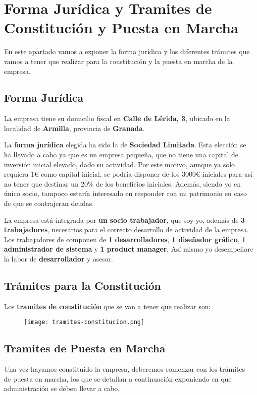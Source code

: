 \section{Forma Jurídica y Tramites de Constitución y Puesta en Marcha}
En este apartado vamos a exponer la forma jurídica y los diferentes trámites que vamos a tener que realizar para la constitución y la puesta en marcha de la empresa.

\subsection{Forma Jurídica}
La empresa tiene su domicilio fiscal en \textbf{Calle de Lérida, 3}, ubicado en la localidad de \textbf{Armilla}, provincia de \textbf{Granada}.

La \textbf{forma jurídica} elegida ha sido la de \textbf{Sociedad Limitada}. Esta elección se ha llevado a cabo ya que es un empresa pequeña, que no tiene una capital de inversión inicial elevado, dado su actividad. Por este motivo, aunque ya solo requiera 1€ como capital inicial, se podría disponer de los 3000€ iniciales para así no tener que destinar un 20\% de los beneficios iniciales. Además, siendo yo en único socio, tampoco estaría interesado en responder con mi patrimonio en caso de que se contrajeran deudas.

La empresa está integrada por \textbf{un socio trabajador}, que soy yo, además de \textbf{3 trabajadores}, necesarios para el correcto desarrollo de actividad de la empresa. Los trabajadores de componen de \textbf{1 desarrolladores}, \textbf{1 diseñador gráfico}, \textbf{1 administrador de sistema} y \textbf{1 product manager}. Así mismo yo desempeñare la labor de \textbf{desarrollador} y {asesor}.

\subsection{Trámites para la Constitución}
Los\textbf{ tramites de constitución} que se van a tener que realizar son:
\begin{figure}[H]
    \centering
    \texttt{[image: tramites-constitucion.png]}
\end{figure}

\subsection{Tramites de Puesta en Marcha}
Una vez hayamos constituido la empresa, deberemos comenzar con los trámites de puesta en marcha, los que se detallan a continuación exponiendo en que administración se deben llevar a cabo.

